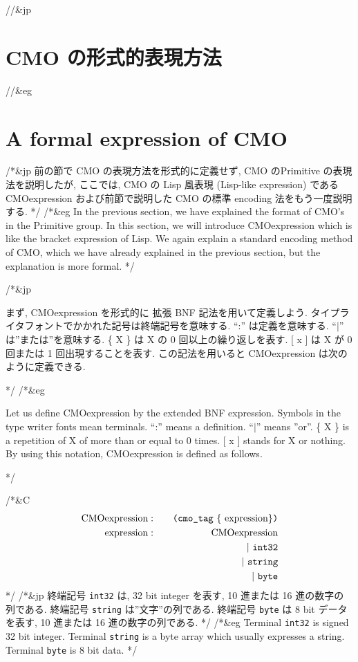 //&jp \section{ CMO の形式的表現方法 }
//&eg \section{ A formal expression of CMO }

/*&jp
前の節で CMO の表現方法を形式的に定義せず, 
CMO のPrimitive の表現法を説明したが,
ここでは, CMO の Lisp 風表現 (Lisp-like expression)
である
CMOexpression
および前節で説明した CMO の標準 encoding 法をもう一度説明する.
*/
/*&eg
In the previous section, we have explained the format of CMO's in the
Primitive group.
In this section, we will introduce CMOexpression which is like the 
bracket expression of Lisp. 
We again explain a standard encoding method of CMO,
which we have already explained in the previous section, but
the explanation is more formal.
*/

/*&jp

まず, CMOexpression を形式的に 拡張 BNF 記法を用いて定義しよう.
タイプライタフォントでかかれた記号は終端記号を意味する.
``:'' は定義を意味する. ``$|$'' は''または''を意味する.
\{ X \} は X の 0 回以上の繰り返しを表す.
[ x ] は X が 0 回または 1 回出現することを表す.
この記法を用いると CMOexpression は次のように定義できる.

*/
/*&eg

Let us define CMOexpression by the extended BNF expression.
Symbols in the type writer fonts mean terminals.
``:'' means a definition.
``$|$'' means ''or''.
\{ X \} is a repetition of X of more than or equal to 0 times.
[ x ] stands for X or nothing.
By using this notation, CMOexpression is defined as follows.

*/

/*&C
\begin{eqnarray*}
\mbox{CMOexpression}  
&:& \quad
\mbox{\tt (} \mbox{\tt cmo\_tag} \ 
\{ \mbox{ expression} \} \mbox{\tt )}\\
\mbox{expression}
&:& \quad  \mbox{CMOexpression} \\
&   &|\   \mbox{\tt int32}  \\
&   &|\   \mbox{\tt string} \\
&   &|\   \mbox{\tt byte} \\
\end{eqnarray*}
*/
/*&jp
終端記号 {\tt int32} は, 32 bit integer を表す, 10 進または 16 進の数字の
列である.
終端記号 {\tt string} は''文字''の列である.
終端記号 {\tt byte} は 8 bit データを表す, 10 進または 16 進の数字の列である.
*/
/*&eg
Terminal {\tt int32} is signed 32 bit integer. 
Terminal {\tt string} is a byte array which usually expresses a string.
Terminal {\tt byte} is 8 bit data.
*/

